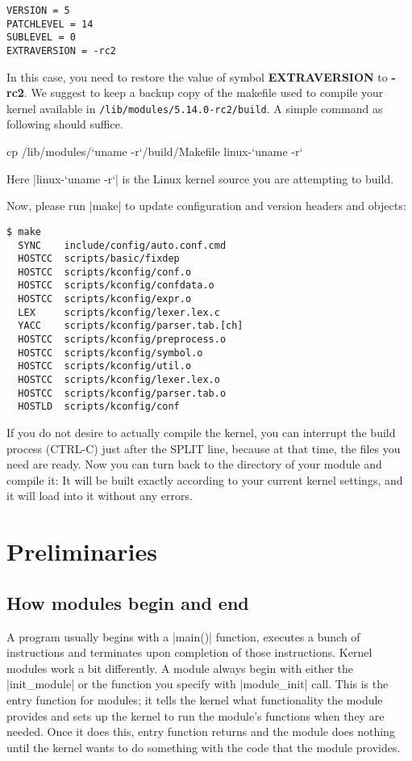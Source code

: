 \documentclass[10pt, oneside]{book}
\begin{document}
\begin{verbatim}
VERSION = 5
PATCHLEVEL = 14
SUBLEVEL = 0
EXTRAVERSION = -rc2
\end{verbatim}

In this case, you need to restore the value of symbol \textbf{EXTRAVERSION} to \textbf{-rc2}.
We suggest to keep a backup copy of the makefile used to compile your kernel available in \verb|/lib/modules/5.14.0-rc2/build|.
A simple command as following should suffice.
\begin{codebash}
cp /lib/modules/`uname -r`/build/Makefile linux-`uname -r`
\end{codebash}
Here \sh|linux-`uname -r`| is the Linux kernel source you are attempting to build.

Now, please run \sh|make| to update configuration and version headers and objects:

\begin{verbatim}
$ make
  SYNC    include/config/auto.conf.cmd
  HOSTCC  scripts/basic/fixdep
  HOSTCC  scripts/kconfig/conf.o
  HOSTCC  scripts/kconfig/confdata.o
  HOSTCC  scripts/kconfig/expr.o
  LEX     scripts/kconfig/lexer.lex.c
  YACC    scripts/kconfig/parser.tab.[ch]
  HOSTCC  scripts/kconfig/preprocess.o
  HOSTCC  scripts/kconfig/symbol.o
  HOSTCC  scripts/kconfig/util.o
  HOSTCC  scripts/kconfig/lexer.lex.o
  HOSTCC  scripts/kconfig/parser.tab.o
  HOSTLD  scripts/kconfig/conf
\end{verbatim}

If you do not desire to actually compile the kernel, you can interrupt the build process (CTRL-C) just after the SPLIT line, because at that time, the files you need are ready.
Now you can turn back to the directory of your module and compile it: It will be built exactly according to your current kernel settings, and it will load into it without any errors.

\section{Preliminaries}
\subsection{How modules begin and end}
\label{sec:module_init_exit}
A program usually begins with a \cpp|main()| function, executes a bunch of instructions and terminates upon completion of those instructions.
Kernel modules work a bit differently. A module always begin with either the \cpp|init_module| or the function you specify with \cpp|module_init| call.
This is the entry function for modules; it tells the kernel what functionality the module provides and sets up the kernel to run the module's functions when they are needed.
Once it does this, entry function returns and the module does nothing until the kernel wants to do something with the code that the module provides.
\end{document}
